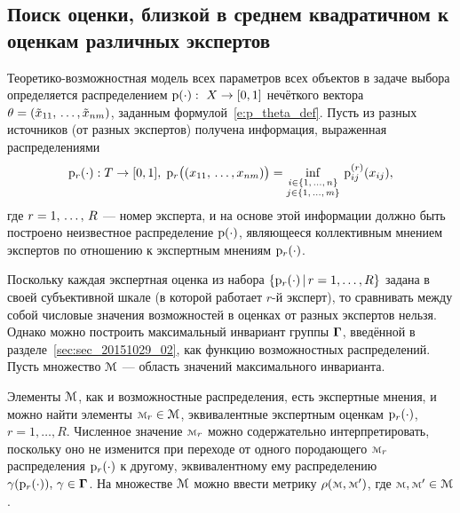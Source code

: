 \subsection{Поиск оценки, близкой в среднем квадратичном к оценкам различных экспертов}
\label{easy_collective_matrix_vector}

Теоретико-возможностная модель всех параметров всех объектов в задаче выбора определяется распределением ${\mathrm{p}}(\cdot):\ X\to[0,1]$ нечёткого вектора $\theta = (\tilde x_{11}, \, \ldots, \tilde x_{nm})$, заданным формулой~\ref{e:p_theta_def}. Пусть из разных источников (от разных экспертов) получена информация, выраженная распределениями 
\begin{equation}
\label{pr_theta_def}
	{\mathrm{p}}_r(\cdot): T \rightarrow [0,1],\; {\mathrm{p}}_r \big((x_{11}, \, \ldots, x_{nm})\big) =  \inf_{\substack{i \in \{1,\, \ldots,\, n\} \\ j \in \{1,\, \ldots,\, m\}}}\,{\mathrm{p}}^{(r)}_{ij}(x_{ij}), 
\end{equation}
где $r = 1,\, \ldots,\, R$ --- номер эксперта, и на основе этой информации должно быть построено неизвестное распределение ${\mathrm{p}}(\cdot)$, являющееся коллективным мнением экспертов по отношению к экспертным мнениям ${\mathrm{p}}_r(\cdot)$. 


Поскольку каждая экспертная оценка из набора $\{{\mathrm{p}}_r(\cdot) \,|\, r = 1, \ldots, R\}$ задана в своей субъективной шкале (в которой работает $r$-й эксперт), то сравнивать между собой числовые значения возможностей в оценках от разных экспертов нельзя. Однако можно построить максимальный инвариант группы $\boldsymbol{\Gamma}$, введённой в разделе~\ref{sec:sec_20151029_02}, как функцию возможностных распределений. Пусть множество ${\EuScript{M}}$ --- область значений максимального инварианта. 

Элементы ${\EuScript{M}}$, как и возможностные распределения, есть экспертные мнения, и можно найти элементы $\calm_r \in \calM$, эквивалентные экспертным оценкам ${\mathrm{p}}_r(\cdot)$, $r = 1, \ldots, R$. Численное значение $\calm_r$ можно содержательно интерпретировать, поскольку оно не изменится при переходе от одного породающего  $\calm_r$ распределения ${\mathrm{p}}_r(\cdot)$ к другому, эквивалентному ему распределению $\gamma({\mathrm{p}}_r(\cdot)),\, \gamma \in \boldsymbol{\Gamma}$. На множестве ${\EuScript{M}}$ можно ввести метрику $\rho(\calm, \calm')$, где $\calm, \calm' \in \calM$.


